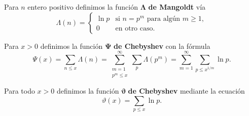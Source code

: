 Para \(n\) entero positivo definimos la funci\'on
\(\boldsymbol{\Lambda}\) \textbf{de Mangoldt} v\'ia 
\[
  \Lambda(n) =
  \begin{cases}
    \ln p &\text{si } n = p^m \text{ para alg\'un } m \geq 1,\\
    0 &\text{en otro caso.}
  \end{cases}
\]

Para \(x > 0\) definimos la funci\'on
\(\boldsymbol{\Psi}\) \textbf{de Chebyshev} con la f\'ormula
\[
  \Psi(x)
  = \sum_{n \leq x} \Lambda(n) 
  = \sum_{\substack{m = 1\\p^m \leq x}}^\infty \sum_p \Lambda(p^m)
  = \sum_{m = 1}^\infty \sum_{p \leq x^{1/m}} \ln p.
\]

Para todo \(x > 0\) definimos la funci\'on \(\boldsymbol{\vartheta}\)
\textbf{de Chebyshev} mediante la ecuaci\'on
\[
  \vartheta(x) = \sum_{p \leq x} \ln p.
\]
